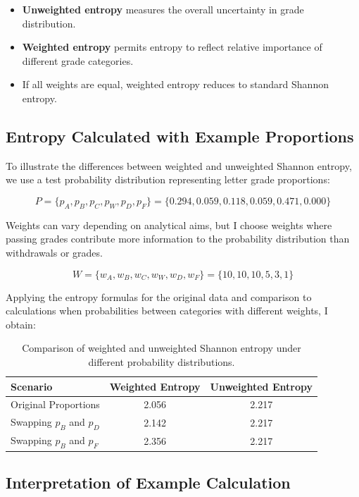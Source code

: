 \documentclass{article}
\begin{document}
\begin{itemize}
    \item \textbf{Unweighted entropy} measures the overall uncertainty in grade distribution.
    \item \textbf{Weighted entropy} permits entropy to reflect relative importance of different grade categories.
    \item If all weights are equal, weighted entropy reduces to standard Shannon entropy.
\end{itemize}

\subsection{Entropy Calculated with Example Proportions}
To illustrate the differences between weighted and unweighted Shannon entropy, we use a test probability distribution representing letter grade proportions:

\[
P = \{ p_A, p_B, p_C, p_W, p_D, p_F \} = \{0.294, 0.059, 0.118, 0.059, 0.471, 0.000\}
\]

Weights can vary depending on analytical aims, but I choose weights where passing grades contribute more information to the probability distribution than withdrawals or grades.

\[
W = \{ w_A, w_B, w_C, w_W, w_D, w_F \} = \{ 10, 10, 10, 5, 3, 1 \}
\]

Applying the entropy formulas for the original data and comparison to calculations when probabilities between categories with different weights, I obtain:

\begin{table}[h]
    \centering
    \begin{tabular}{lcc}
        \hline
        \textbf{Scenario} & \textbf{Weighted Entropy} & \textbf{Unweighted Entropy} \\
        \hline
        Original Proportions & 2.056 & 2.217 \\
        Swapping \( p_B \) and \( p_D \) & 2.142 & 2.217 \\
        Swapping \( p_B \) and \( p_F \) & 2.356 & 2.217 \\
        \hline
    \end{tabular}
    \caption{Comparison of weighted and unweighted Shannon entropy under different probability distributions.}
    \label{tab:entropy_comparison}
\end{table}

\subsection{Interpretation of Example Calculation}
\end{document}
